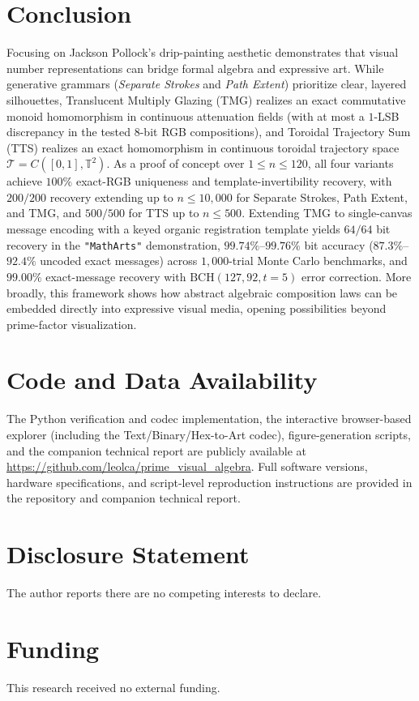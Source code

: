 \documentclass[]{interact}
\theoremstyle{plain}
\theoremstyle{definition}
\theoremstyle{remark}
\begin{document}
\section{Conclusion}
Focusing on Jackson Pollock's drip-painting aesthetic demonstrates that visual number representations can bridge formal algebra and expressive art. While generative grammars (\emph{Separate Strokes} and \emph{Path Extent}) prioritize clear, layered silhouettes, Translucent Multiply Glazing (TMG) realizes an exact commutative monoid homomorphism in continuous attenuation fields (with at most a $1$-LSB discrepancy in the tested 8-bit RGB compositions), and Toroidal Trajectory Sum (TTS) realizes an exact homomorphism in continuous toroidal trajectory space $\mathcal{T} = C([0,1], \mathbb{T}^2)$. As a proof of concept over $1 \le n \le 120$, all four variants achieve $100\%$ exact-RGB uniqueness and template-invertibility recovery, with $200/200$ recovery extending up to $n \le 10{,}000$ for Separate Strokes, Path Extent, and TMG, and $500/500$ for TTS up to $n \le 500$. Extending TMG to single-canvas message encoding with a keyed organic registration template yields $64/64$ bit recovery in the \texttt{"MathArts"} demonstration, $99.74\%$--$99.76\%$ bit accuracy ($87.3\%$--$92.4\%$ uncoded exact messages) across $1{,}000$-trial Monte Carlo benchmarks, and $99.00\%$ exact-message recovery with $\mathrm{BCH}(127, 92, t=5)$ error correction. More broadly, this framework shows how abstract algebraic composition laws can be embedded directly into expressive visual media, opening possibilities beyond prime-factor visualization.

\section*{Code and Data Availability}
The Python verification and codec implementation, the interactive browser-based explorer (including the Text/Binary/Hex-to-Art codec), figure-generation scripts, and the companion technical report are publicly available at \url{https://github.com/leolca/prime_visual_algebra}. Full software versions, hardware specifications, and script-level reproduction instructions are provided in the repository and companion technical report.

\section*{Disclosure Statement}
The author reports there are no competing interests to declare.

\section*{Funding}
This research received no external funding.



\end{document}
